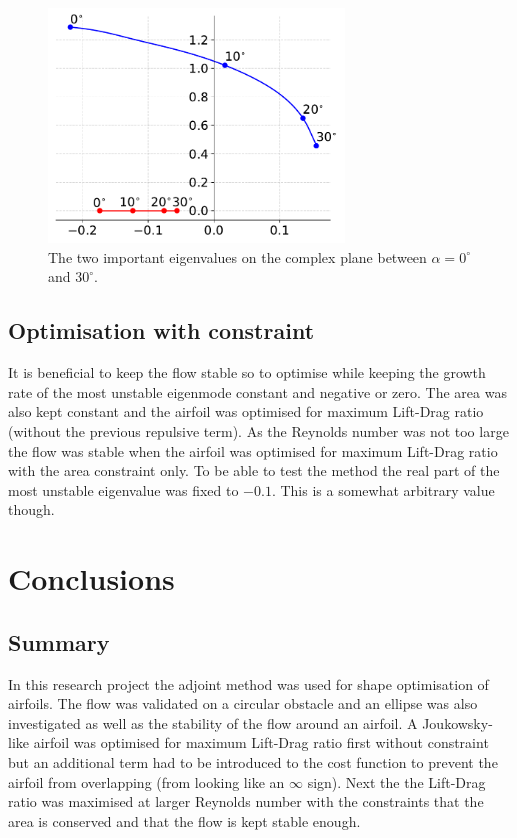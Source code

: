 \documentclass[12pt, a4paper]{article}
\begin{document}
\begin{figure}[htbp]
    \centering
    \includegraphics[width=0.7\textwidth]{maxS}
    \caption{The two important eigenvalues on the complex plane between $\alpha = 0^\circ$ and $30^\circ$.}
    \label{fig:eigenvalue_change}
\end{figure}

\subsection{Optimisation with constraint}
It is beneficial to keep the flow stable so to optimise while keeping the growth rate of the most unstable eigenmode constant and negative or zero. The area was also kept constant and the airfoil was optimised for maximum Lift-Drag ratio (without the previous repulsive term). As the Reynolds number was not too large the flow was stable when the airfoil was optimised for maximum Lift-Drag ratio with the area constraint only. To be able to test the method the real part of the most unstable eigenvalue was fixed to $-0.1$. This is a somewhat arbitrary value though. 


\section{Conclusions}
        \subsection{Summary}
            In this research project the adjoint method was used for shape optimisation of airfoils. The flow was validated on a circular obstacle and an ellipse was also investigated as well as the stability of the flow around an airfoil. A Joukowsky-like airfoil was optimised for maximum Lift-Drag ratio first without constraint but an additional term had to be introduced to the cost function to prevent the airfoil from overlapping (from looking like an $\infty$ sign). Next the the Lift-Drag ratio was maximised at larger Reynolds number with the constraints that the area is conserved and that the flow is kept stable enough.
            
\end{document}
